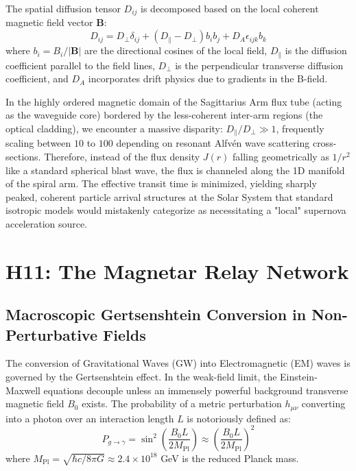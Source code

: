 \documentclass[12pt,a4paper]{article}
\begin{document}
The spatial diffusion tensor $D_{ij}$ is decomposed based on the local coherent magnetic field vector $\mathbf{B}$:
\begin{equation}
    D_{ij} = D_\perp \delta_{ij} + (D_\parallel - D_\perp) b_i b_j + D_A \epsilon_{ijk} b_k
\end{equation}
where $b_i = B_i / |\mathbf{B}|$ are the directional cosines of the local field, $D_\parallel$ is the diffusion coefficient parallel to the field lines, $D_\perp$ is the perpendicular transverse diffusion coefficient, and $D_A$ incorporates drift physics due to gradients in the B-field. 

In the highly ordered magnetic domain of the Sagittarius Arm flux tube (acting as the waveguide core) bordered by the less-coherent inter-arm regions (the optical cladding), we encounter a massive disparity: $D_\parallel / D_\perp \gg 1$, frequently scaling between $10$ to $100$ depending on resonant Alfvén wave scattering cross-sections. Therefore, instead of the flux density $J(r)$ falling geometrically as $1/r^2$ like a standard spherical blast wave, the flux is channeled along the 1D manifold of the spiral arm. The effective transit time is minimized, yielding sharply peaked, coherent particle arrival structures at the Solar System that standard isotropic models would mistakenly categorize as necessitating a "local" supernova acceleration source.

\section{H11: The Magnetar Relay Network}
\subsection{Macroscopic Gertsenshtein Conversion in Non-Perturbative Fields}

The conversion of Gravitational Waves (GW) into Electromagnetic (EM) waves is governed by the Gertsenshtein effect. In the weak-field limit, the Einstein-Maxwell equations decouple unless an immensely powerful background transverse magnetic field $B_0$ exists. The probability of a metric perturbation $h_{\mu\nu}$ converting into a photon over an interaction length $L$ is notoriously defined as:
\begin{equation}
    P_{g \to \gamma} = \sin^2 \left( \frac{B_0 L}{2 M_{\text{Pl}}} \right) \approx \left( \frac{B_0 L}{2 M_{\text{Pl}}} \right)^2
\end{equation}
where $M_{\text{Pl}} = \sqrt{\hbar c / 8\pi G} \approx 2.4 \times 10^{18}$ GeV is the reduced Planck mass. 
\end{document}
